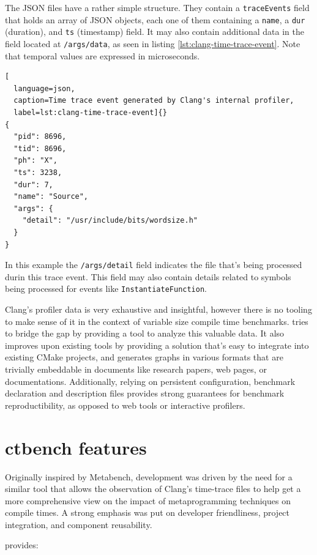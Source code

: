 \documentclass[../../main.tex]{subfiles}
\begin{document}
The JSON files have a rather simple structure. They contain a
\lstinline{traceEvents} field that holds an array of JSON objects, each one of
them containing a \lstinline{name}, a \lstinline{dur} (duration), and
\lstinline{ts} (timestamp) field. It may also contain additional data in the
field located at \lstinline{/args/data}, as seen in listing
\ref{lst:clang-time-trace-event}. Note that temporal values are expressed in
microseconds.

\begin{lstlisting}[
  language=json,
  caption=Time trace event generated by Clang's internal profiler,
  label=lst:clang-time-trace-event]{}
{
  "pid": 8696,
  "tid": 8696,
  "ph": "X",
  "ts": 3238,
  "dur": 7,
  "name": "Source",
  "args": {
    "detail": "/usr/include/bits/wordsize.h"
  }
}
\end{lstlisting}

In this example the \lstinline{/args/detail} field indicates the file that's
being processed durin this trace event. This field may also contain details
related to symbols being processed for events like
\lstinline{InstantiateFunction}.

Clang's profiler data is very exhaustive and insightful, however there is no
tooling to make sense of it in the context of variable size compile time
benchmarks. \ctbench tries to bridge the gap by providing a tool to analyze
this valuable data. It also improves upon existing tools by providing a solution
that's easy to integrate into existing CMake projects, and generates graphs in
various formats that are trivially embeddable in documents like research papers,
web pages, or documentations. Additionally, relying on persistent configuration,
benchmark declaration and description files provides strong guarantees for
benchmark reproductibility, as opposed to web tools or interactive profilers.

\section{ctbench features}

Originally inspired by Metabench\cite{metabench}, \ctbench development was
driven by the need for a similar tool that allows the observation of Clang's
time-trace files to help get a more comprehensive view on the impact of
metaprogramming techniques on compile times. A strong emphasis was put on
developer friendliness, project integration, and component reusability.

\ctbench provides:
\end{document}
